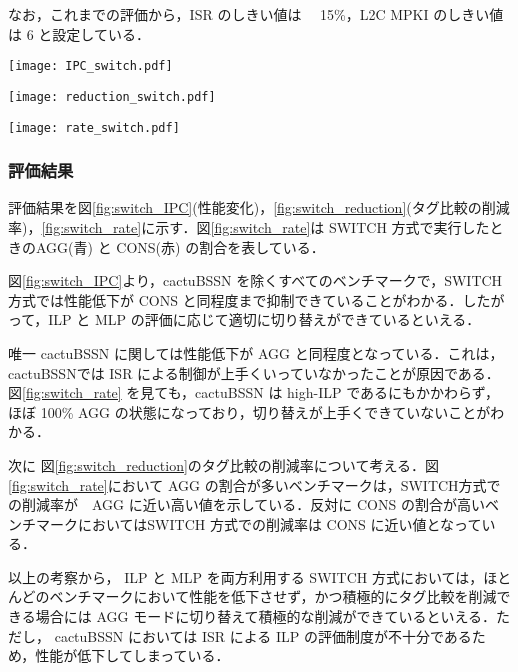 \documentclass[twocolumn]{jsarticle}
\begin{document}
  なお，これまでの評価から，ISR のしきい値は 　15\%，L2C MPKI のしきい値は 6 と設定している．
  

  \begin{figure*}[ht]
    \centering
    \texttt{[image: IPC\_switch.pdf]}
    \caption{SWITCH 方式による性能変化}  
    \label{fig:switch_IPC}
  \end{figure*}
  \begin{figure*}[ht]
    \centering
    \texttt{[image: reduction\_switch.pdf]}
    \caption{SWITCH 方式によるタグ比較の削減}  
    \label{fig:switch_reduction}
  \end{figure*}
  \begin{figure*}[ht]
    \centering
    \texttt{[image: rate\_switch.pdf]}
    \caption{AGG モードである割合}  
    \label{fig:switch_rate}
  \end{figure*}


  \subsubsection{評価結果}
  評価結果を図\ref{fig:switch_IPC}(性能変化)，\ref{fig:switch_reduction}(タグ比較の削減率)，\ref{fig:switch_rate}に示す．図\ref{fig:switch_rate}は SWITCH 方式で実行したときのAGG(青) と CONS(赤) の割合を表している．

  図\ref{fig:switch_IPC}より，cactuBSSN を除くすべてのベンチマークで，SWITCH 方式では性能低下が CONS と同程度まで抑制できていることがわかる．したがって，ILP と MLP の評価に応じて適切に切り替えができているといえる．

  唯一 cactuBSSN に関しては性能低下が AGG と同程度となっている．これは， cactuBSSNでは ISR による制御が上手くいっていなかったことが原因である．図\ref{fig:switch_rate} を見ても，cactuBSSN は high-ILP であるにもかかわらず，ほぼ 100\% AGG の状態になっており，切り替えが上手くできていないことがわかる．

  次に 図\ref{fig:switch_reduction}のタグ比較の削減率について考える．図\ref{fig:switch_rate}において AGG の割合が多いベンチマークは，SWITCH方式での削減率が　AGG に近い高い値を示している．反対に CONS の割合が高いベンチマークにおいてはSWITCH 方式での削減率は CONS に近い値となっている．

  以上の考察から， ILP と MLP を両方利用する SWITCH 方式においては，ほとんどのベンチマークにおいて性能を低下させず，かつ積極的にタグ比較を削減できる場合には AGG モードに切り替えて積極的な削減ができているといえる．ただし， cactuBSSN においては ISR による ILP の評価制度が不十分であるため，性能が低下してしまっている．
\end{document}
